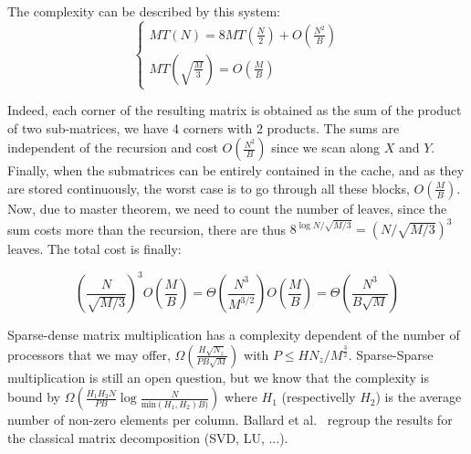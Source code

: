 The complexity can be described by this system:
$$
\left\{
    \begin{array}{ll}
        MT(N) = 8MT(\frac{N}{2}) + O(\frac{N^{2}}{B}) \\
        MT(\sqrt{\frac{M}{3}}) = O(\frac{M}{B})
    \end{array}
\right.
$$

Indeed, each corner of the resulting matrix is obtained as the sum of the product of two sub-matrices, we have 4 corners with 2 products. The sums are independent of the recursion and cost $O(\frac{N^{2}}{B})$ since we scan along $X$ and $Y$. Finally, when the submatrices can be entirely contained in the cache, and as they are stored continuously, the worst case is to go through all these blocks, $O(\frac{M}{B})$. Now, due to master theorem, we need to count the number of leaves, since the sum costs more than the recursion, there are thus $8^{\log N / \sqrt{M / 3}} = (N / \sqrt{M / 3})^{3}$ leaves. The total cost is finally:

$$ (\frac{N}{\sqrt{M / 3}})^{3} O(\frac{M}{B}) = \Theta(\frac{N^{3}}{M^{3/2}}) O(\frac{M}{B}) = \Theta(\frac{N^{3}}{B\sqrt{M}}) $$



Sparse-dense matrix multiplication has a complexity dependent of the number of processors that we may offer, $\Omega(\frac{H\sqrt{N_{z}}}{PB\sqrt{M}})$ with $P \leq
HN_{z} / M^{\frac{3}{2}}$. Sparse-Sparse multiplication is still an open question, but we know that the complexity is bound by $\Omega(\frac{H_{1}H_{2}N}{PB} \log \frac{N}{\text{min}(H_{1}, H_{2}) B)})$ where $H_{1}$ (respectivelly $H_{2}$) is the average number of non-zero elements per column. Ballard et al.~\cite{ballard2011minimizing} regroup the results for the classical matrix decomposition (SVD, LU, ...).